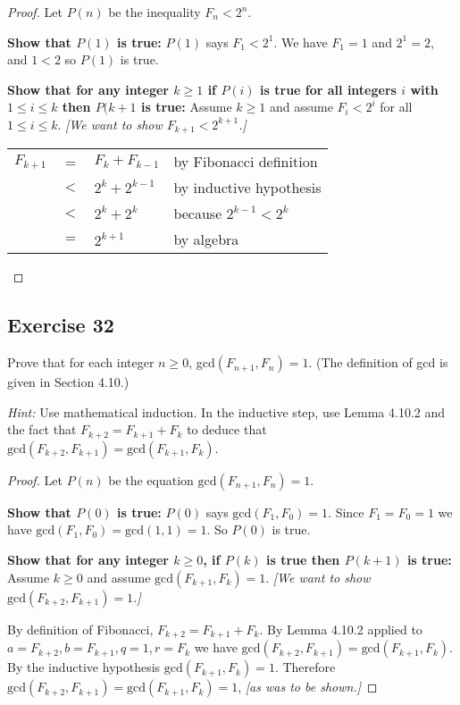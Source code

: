 \documentclass[14pt]{extarticle}
\newcommand{\cy}{\color{cyan}}
\begin{document}
\begin{proof}
    Let $P(n)$ be the inequality $F_n < 2^n$.

        {\bf Show that $P(1)$ is true:}
    $P(1)$ says $F_1 < 2^1$. We have $F_1 = 1$ and $2^1 = 2$, and $1 < 2$ so $P(1)$ is true.

        {\bf Show that for any integer $k \geq 1$ if $P(i)$ is true for all integers $i$ with $1 \leq i \leq k$ then $P(k+1$
            is true:}
    Assume $k \geq 1$ and assume $F_i < 2^i$ for all $1 \leq i \leq k$. {\it [We want to show $F_{k+1} < 2^{k+1}$.]}

    \begin{center}
        \begin{tabular}{rcll}
            \(F_{k+1}\) & =   & \(F_k + F_{k - 1}\) & {\cy by Fibonacci definition}   \\
                        & $<$ & \(2^k + 2^{k - 1}\) & {\cy by inductive hypothesis}   \\
                        & $<$ & \(2^k + 2^k\)       & {\cy because \(2^{k-1} < 2^k\)} \\
                        & $=$ & \(2^{k+1}\)         & {\cy by algebra}
        \end{tabular}
    \end{center}
\end{proof}

\subsection{Exercise 32}
Prove that for each integer $n \geq 0$, gcd$(F_{n + 1}, F_n) = 1$.
(The definition of gcd is given in Section 4.10.)

{\it Hint:} Use mathematical induction. In the inductive step, use Lemma 4.10.2 and the fact that
\(F_{k+2} = F_{k+1} + F_k\) to deduce that \(\text{gcd}(F_{k+2}, F_{k+1}) = \text{gcd}(F_{k+1}, F_k)\).

\begin{proof}
    Let \(P(n)\) be the equation \(\text{gcd}(F_{n + 1}, F_n) = 1\).

        {\bf Show that \(P(0)\) is true:} \(P(0)\) says \(\text{gcd}(F_1, F_0) = 1\). Since \(F_1 = F_0 = 1\) we
    have \(\text{gcd}(F_1, F_0) = \text{gcd}(1, 1) = 1\). So \(P(0)\) is true.

        {\bf Show that for any integer $k \geq 0$, if \(P(k)\) is true then \(P(k+1)\) is true:}
    Assume \(k \geq 0\) and assume \(\text{gcd}(F_{k+1}, F_k) = 1\).
        {\it [We want to show \(\text{gcd}(F_{k+2}, F_{k+1}) = 1\).]}

    By definition of Fibonacci, \(F_{k+2} = F_{k+1} + F_k\).
    By Lemma 4.10.2 applied to \(a = F_{k+2}, b = F_{k+1}, q = 1, r = F_k\) we have
    \(\text{gcd}(F_{k+2}, F_{k+1}) = \text{gcd}(F_{k+1}, F_k)\).
    By the inductive hypothesis \(\text{gcd}(F_{k+1}, F_k) = 1\).
    Therefore \(\text{gcd}(F_{k+2}, F_{k+1}) = \text{gcd}(F_{k+1}, F_k) = 1\), {\it [as was to be shown.]}
\end{proof}
\end{document}
